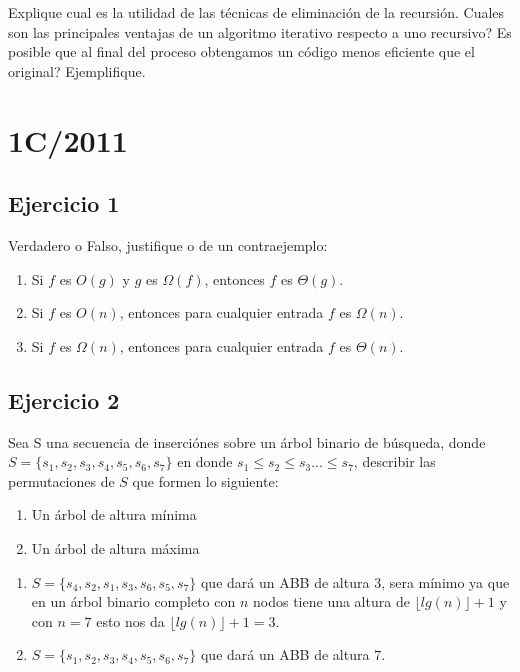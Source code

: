 \documentclass[10pt, a4paper]{article}
\begin{document}
Explique cual es la utilidad de las t\'ecnicas de eliminaci\'on de la recursi\'on. Cuales son las principales ventajas de un algoritmo iterativo respecto a uno recursivo? Es posible que al final del proceso obtengamos un c\'odigo menos eficiente que el original? Ejemplifique.

\newpage
\section{1C/2011}

\subsection*{Ejercicio 1}

Verdadero o Falso, justifique o de un contraejemplo:
\begin{enumerate}
 \item Si $f$ es $O(g)$ y $g$ es $\Omega(f)$, entonces $f$ es $\Theta(g)$.
 \item Si $f$ es $O(n)$, entonces para cualquier entrada $f$ es $\Omega(n)$.
 \item Si $f$ es $\Omega(n)$, entonces para cualquier entrada $f$ es $\Theta(n)$.
\end{enumerate}

\subsection*{Ejercicio 2}

Sea S una secuencia de inserci\'ones sobre un \'arbol binario de b\'usqueda, donde $S = \{ s_1, s_2, s_3, s_4, s_5, s_6, s_7\}$ en donde $s_1 \leq s_2 \leq s_3 ... \leq s_7$, describir las permutaciones de $S$ que formen lo siguiente:
\begin{enumerate}
 \item Un \'arbol de altura m\'inima
 \item Un \'arbol de altura m\'axima
\end{enumerate}

\begin{enumerate}
 \item $S = \{ s_4, s_2, s_1, s_3, s_6, s_5, s_7\}$ que dar\'a un ABB de altura $3$, sera m\'inimo ya que en un \'arbol binario completo con $n$ nodos tiene una altura de $\lfloor lg(n) \rfloor + 1$ y con $n=7$ esto nos da $\lfloor lg(n) \rfloor + 1 = 3$.
 \item $S = \{ s_1, s_2, s_3, s_4, s_5, s_6, s_7\}$ que dar\'a un ABB de altura $7$.
\end{enumerate}
\end{document}
